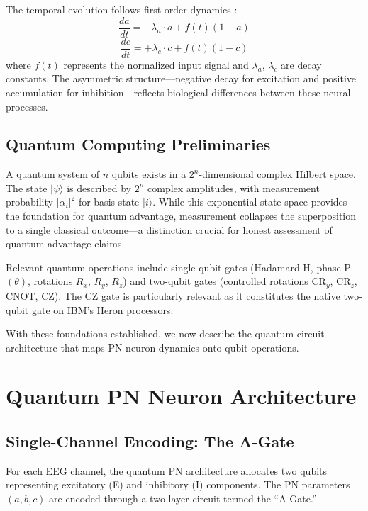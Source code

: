 \documentclass[11pt,a4paper]{article}
\begin{document}
The temporal evolution follows first-order dynamics \citep[Equations 8.51--8.53]{gupta2003}:
\begin{equation}
\frac{da}{dt} = -\lambda_a \cdot a + f(t)(1 - a)
\end{equation}
\begin{equation}
\frac{dc}{dt} = +\lambda_c \cdot c + f(t)(1 - c)
\end{equation}
where $f(t)$ represents the normalized input signal and $\lambda_a$, $\lambda_c$ are decay constants. The asymmetric structure---negative decay for excitation and positive accumulation for inhibition---reflects biological differences between these neural processes.

\subsection{Quantum Computing Preliminaries}

A quantum system of $n$ qubits exists in a $2^n$-dimensional complex Hilbert space. The state $|\psi\rangle$ is described by $2^n$ complex amplitudes, with measurement probability $|\alpha_i|^2$ for basis state $|i\rangle$. While this exponential state space provides the foundation for quantum advantage, measurement collapses the superposition to a single classical outcome---a distinction crucial for honest assessment of quantum advantage claims.

Relevant quantum operations include single-qubit gates (Hadamard H, phase P$(\theta)$, rotations $R_x$, $R_y$, $R_z$) and two-qubit gates (controlled rotations CR$_y$, CR$_z$, CNOT, CZ). The CZ gate is particularly relevant as it constitutes the native two-qubit gate on IBM's Heron processors.

With these foundations established, we now describe the quantum circuit architecture that maps PN neuron dynamics onto qubit operations.

\section{Quantum PN Neuron Architecture}

\subsection{Single-Channel Encoding: The A-Gate}

For each EEG channel, the quantum PN architecture allocates two qubits representing excitatory (E) and inhibitory (I) components. The PN parameters $(a, b, c)$ are encoded through a two-layer circuit termed the ``A-Gate.''
\end{document}
